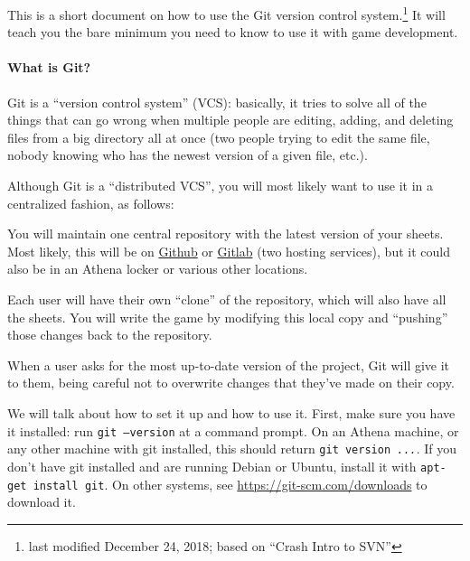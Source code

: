 \documentclass[green]{testgame}
\begin{document}
\newcommand{\ter}[1]{\fbox{\parbox{6.5in}{{\tt #1}}}}


This is a short document on how to use the Git version control
system.\footnote{last modified December 24, 2018; based on ``Crash Intro to SVN''} It will teach you the
bare minimum you need to know to use it with game development.

\paragraph*{What is Git?}

Git is a ``version control system'' (VCS): basically,
it tries to solve all of the things that can go wrong when multiple
people are editing, adding, and deleting files from a big directory all
at once (two people trying to edit the same file, nobody knowing who
has the newest version of a given file, etc.).

Although Git is a ``distributed VCS'', you will most likely want to use it in a centralized fashion, as follows:


\begin{itemz}[]

\item You will maintain one central repository with the latest version of your sheets. Most likely, this will be on \href{https://github.com}{Github} or \href{https://gitlab.com}{Gitlab} (two hosting services), but it could also be in an Athena locker or various other locations.

\item Each user will have their own ``clone'' of the repository, which will also have all the sheets. You will write the game by modifying this local copy and ``pushing'' those changes back to the repository.

\item When a user asks for the most up-to-date version of the project, Git will give it to them, being careful not to overwrite changes that they've made on their copy.

\end{itemz}

We will talk about how to set it up and how to use it. First, make sure you have it installed: run \texttt{git --version} at a command prompt. On an Athena machine, or any other machine with git installed, this should return \texttt{git version \textit{...}}. If you don't have git installed and are running Debian or Ubuntu, install it with \texttt{apt-get install git}. On other systems, see \url{https://git-scm.com/downloads} to download it.
\end{document}
